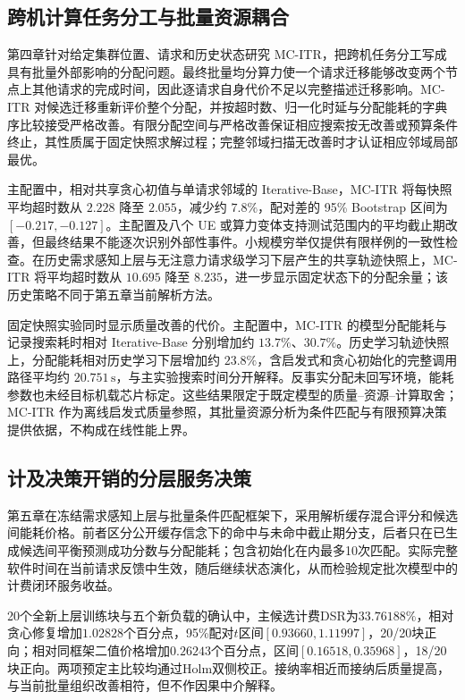 \subsection{跨机计算任务分工与批量资源耦合}
\label{sec:ch6-snapshot-summary}

第四章针对给定集群位置、请求和历史状态研究 MC-ITR，把跨机任务分工写成具有批量外部影响的分配问题。最终批量均分算力使一个请求迁移能够改变两个节点上其他请求的完成时间，因此逐请求自身代价不足以完整描述迁移影响。MC-ITR 对候选迁移重新评价整个分配，并按超时数、归一化时延与分配能耗的字典序比较接受严格改善。有限分配空间与严格改善保证相应搜索按无改善或预算条件终止，其性质属于固定快照求解过程；完整邻域扫描无改善时才认证相应邻域局部最优。

主配置中，相对共享贪心初值与单请求邻域的 Iterative-Base，MC-ITR 将每快照平均超时数从 $2.228$ 降至 $2.055$，减少约 $7.8\%$，配对差的 95\% Bootstrap 区间为 $[-0.217,-0.127]$。主配置及八个 UE 或算力变体支持测试范围内的平均截止期改善，但最终结果不能逐次识别外部性事件。小规模穷举仅提供有限样例的一致性检查。在历史需求感知上层与无注意力请求级学习下层产生的共享轨迹快照上，MC-ITR 将平均超时数从 $10.695$ 降至 $8.235$，进一步显示固定状态下的分配余量；该历史策略不同于第五章当前解析方法。

固定快照实验同时显示质量改善的代价。主配置中，MC-ITR 的模型分配能耗与记录搜索耗时相对 Iterative-Base 分别增加约 $13.7\%$、$30.7\%$。历史学习轨迹快照上，分配能耗相对历史学习下层增加约 $23.8\%$，含启发式和贪心初始化的完整调用路径平均约 $20.751\,\mathrm{s}$，与主实验搜索时间分开解释。反事实分配未回写环境，能耗参数也未经目标机载芯片标定。这些结果限定于既定模型的质量--资源--计算取舍；MC-ITR 作为离线启发式质量参照，其批量资源分析为条件匹配与有限预算决策提供依据，不构成在线性能上界。

\subsection{计及决策开销的分层服务决策}
\label{sec:ch6-sfhlm-summary}
第五章在冻结需求感知上层与批量条件匹配框架下，采用解析缓存混合评分和候选间能耗价格。前者区分公开缓存信念下的命中与未命中截止期分支，后者只在已生成候选间平衡预测成功分数与分配能耗；包含初始化在内最多10次匹配。实际完整软件时间在当前请求反馈中生效，随后继续状态演化，从而检验规定批次模型中的计费闭环服务收益。

20个全新上层训练块与五个新负载的确认中，主候选计费DSR为$33.76188\%$，相对贪心修复增加$1.02828$个百分点，95\%配对$t$区间$[0.93660,1.11997]$，20/20块正向；相对同框架二值价格增加$0.26243$个百分点，区间$[0.16518,0.35968]$，18/20块正向。两项预定主比较均通过Holm双侧校正。接纳率相近而接纳后质量提高，与当前批量组织改善相符，但不作因果中介解释。

